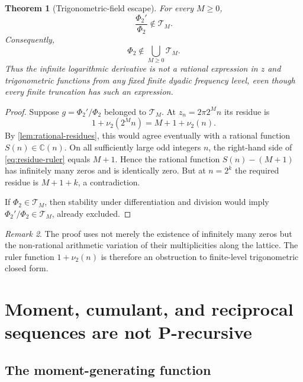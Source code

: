 \documentclass[11pt]{article}
\numberwithin{equation}{section}
\newtheorem{theorem}{Theorem}[section]
\theoremstyle{definition}
\theoremstyle{remark}
\newtheorem{remark}[theorem]{Remark}
\newcommand{\C}{\mathbb C}
\begin{document}
\begin{theorem}[Trigonometric-field escape]
\label{thm:field-escape}
For every $M\ge0$,
\begin{equation}
 \boxed{
 \frac{\Phi_2'}{\Phi_2}\notin\mathcal T_M.}
 \label{eq:log-derivative-escape}
\end{equation}
Consequently,
\begin{equation}
 \Phi_2\notin\bigcup_{M\ge0}\mathcal T_M.
 \label{eq:Phi-field-escape}
\end{equation}
Thus the infinite logarithmic derivative is not a rational expression in $z$
and trigonometric functions from any fixed finite dyadic frequency level,
even though every finite truncation has such an expression.
\end{theorem}
\begin{proof}
Suppose $g=\Phi_2'/\Phi_2$ belonged to $\mathcal T_M$.  At
$z_n=2\pi2^Mn$ its residue is
\begin{equation}
 1+\nu_2(2^Mn)=M+1+\nu_2(n).
 \label{eq:residue-ruler}
\end{equation}
By \cref{lem:rational-residues}, this would agree eventually with a rational
function $S(n)\in\C(n)$.  On all sufficiently large odd integers $n$, the
right-hand side of \eqref{eq:residue-ruler} equals $M+1$.  Hence the rational
function $S(n)-(M+1)$ has infinitely many zeros and is identically zero.  But
at $n=2^k$ the required residue is $M+1+k$, a contradiction.

If $\Phi_2\in\mathcal T_M$, then stability under differentiation and division
would imply $\Phi_2'/\Phi_2\in\mathcal T_M$, already excluded.
\end{proof}

\begin{remark}
The proof uses not merely the existence of infinitely many zeros but the
non-rational arithmetic variation of their multiplicities along the lattice.
The ruler function $1+\nu_2(n)$ is therefore an obstruction to finite-level
trigonometric closed form.
\end{remark}

\section{Moment, cumulant, and reciprocal sequences are not P-recursive}
\label{sec:moment-nonprecursive}

\subsection{The moment-generating function}
\end{document}
